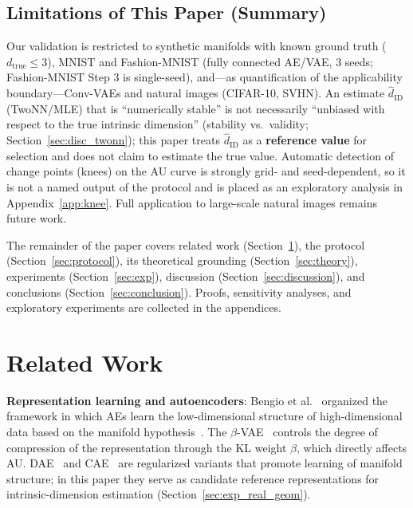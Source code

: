 \documentclass[make,article,submit,pdftex,moreauthors]{Definitions/mdpi}
\newcommand{\hatdID}{\hat{d}_{\mathrm{ID}}}
\newcommand{\dtrue}{d_{\mathrm{true}}}
\begin{document}
\subsection{Limitations of This Paper (Summary)}\label{sec:intro_limits}

Our validation is restricted to synthetic manifolds with known ground truth
($\dtrue \leq 3$), MNIST and Fashion-MNIST (fully connected AE/VAE,
3 seeds; Fashion-MNIST Step 3 is single-seed), and---as quantification of
the applicability boundary---Conv-VAEs and natural images (CIFAR-10, SVHN).
An estimate $\hatdID$ (TwoNN/MLE) that is ``numerically stable'' is not
necessarily ``unbiased with respect to the true intrinsic dimension''
(stability vs.\ validity; Section~\ref{sec:disc_twonn}); this paper treats
$\hatdID$ as a \textbf{reference value} for selection and does not claim to
estimate the true value.
Automatic detection of change points (knees) on the AU curve is strongly
grid- and seed-dependent, so it is not a named output of the protocol and is
placed as an exploratory analysis in Appendix~\ref{app:knee}.
Full application to large-scale natural images remains future work.

The remainder of the paper covers related work (Section~\ref{sec:related}),
the protocol (Section~\ref{sec:protocol}), its theoretical grounding
(Section~\ref{sec:theory}), experiments (Section~\ref{sec:exp}), discussion
(Section~\ref{sec:discussion}), and conclusions
(Section~\ref{sec:conclusion}).
Proofs, sensitivity analyses, and exploratory experiments are collected in
the appendices.

\section{Related Work}\label{sec:related}

\textbf{Representation learning and autoencoders}:
Bengio et al.~\cite{bengio2013representation} organized the framework in
which AEs learn the low-dimensional structure of high-dimensional data based
on the manifold hypothesis~\cite{fefferman2016manifold}.
The $\beta$-VAE~\cite{higgins2017betavae} controls the degree of compression
of the representation through the KL weight $\beta$, which directly affects
AU.
DAE~\cite{alain2014dae} and CAE~\cite{rifai2011cae} are regularized variants
that promote learning of manifold structure; in this paper they serve as
candidate reference representations for intrinsic-dimension estimation
(Section~\ref{sec:exp_real_geom}).
\end{document}

